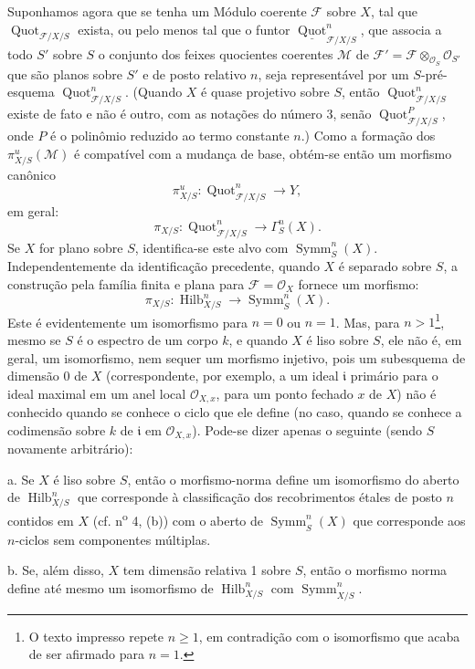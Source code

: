 Suponhamos agora que se tenha um Módulo coerente $\mathcal F$ sobre $X$, tal
que $\operatorname{Quot}_{\mathcal F/X/S}$ exista, ou pelo menos tal que o
funtor $\underline{\operatorname{Quot}}^n_{\mathcal F/X/S}$, que associa a
todo $S'$ sobre $S$ o conjunto dos feixes quocientes coerentes $\mathcal M$ de
$\mathcal F'=\mathcal F\otimes_{\mathcal O_S}\mathcal O_{S'}$ que são planos
sobre $S'$ e de posto relativo $n$, seja representável por um $S$-pré-esquema
$\operatorname{Quot}^n_{\mathcal F/X/S}$. (Quando $X$ é quase projetivo sobre
$S$, então $\operatorname{Quot}^n_{\mathcal F/X/S}$ existe de fato e não é
outro, com as notações do número 3, senão
$\operatorname{Quot}^P_{\mathcal F/X/S}$, onde $P$ é o polinômio reduzido ao
termo constante $n$.) Como a formação dos $\pi^u_{X/S}(\mathcal M)$ é
compatível com a mudança de base, obtém-se então um morfismo canônico
\[
\pi^u_{X/S}:\operatorname{Quot}^n_{\mathcal F/X/S}\longrightarrow Y,
\]
em geral:
\[
\pi_{X/S}:\operatorname{Quot}^n_{\mathcal F/X/S}
\longrightarrow\Gamma^n_S(X).
\]
Se $X$ for plano sobre $S$, identifica-se este alvo com $\operatorname{Symm}^n_S(X)$.
Independentemente da identificação precedente, quando $X$ é separado sobre $S$, a construção pela família finita e plana para $\mathcal F=\mathcal O_X$ fornece um morfismo:
\[
\pi_{X/S}:\operatorname{Hilb}^n_{X/S}
\longrightarrow\operatorname{Symm}^n_S(X).
\]
Este é evidentemente um isomorfismo para $n=0$ ou $n=1$. Mas, para
$n>1$\footnote{O texto impresso repete $n\geq1$, em contradição com o
isomorfismo que acaba de ser afirmado para $n=1$.}, mesmo se $S$ é o espectro
de um corpo $k$, e quando $X$ é liso sobre $S$, ele não é, em geral, um
isomorfismo, nem sequer um morfismo injetivo, pois um subesquema de dimensão 0
de $X$ (correspondente, por exemplo, a um ideal $\mathfrak i$ primário para o
ideal maximal em um anel local $\mathcal O_{X,x}$, para um ponto fechado $x$ de
$X$) não é conhecido quando se conhece o ciclo que ele define (no caso, quando
se conhece a codimensão sobre $k$ de $\mathfrak i$ em $\mathcal O_{X,x}$).
Pode-se dizer apenas o seguinte (sendo $S$ novamente arbitrário):

\medskip
\noindent a. Se $X$ é liso sobre $S$, então o morfismo-norma define um
isomorfismo do aberto de $\operatorname{Hilb}^n_{X/S}$ que corresponde à
classificação dos recobrimentos étales de posto $n$ contidos em $X$ (cf.
n\textsuperscript{o} 4, (b)) com o aberto de
$\operatorname{Symm}^n_S(X)$ que corresponde aos $n$-ciclos sem componentes
múltiplas.

\medskip
\noindent b. Se, além disso, $X$ tem dimensão relativa 1 sobre $S$, então o
morfismo norma define até mesmo um isomorfismo de
$\operatorname{Hilb}^n_{X/S}$ com $\operatorname{Symm}^n_{X/S}$.

